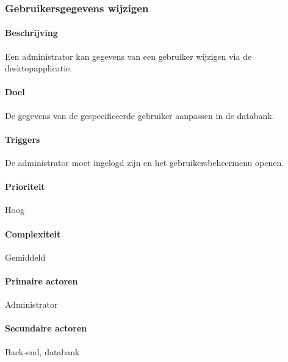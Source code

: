 \subsubsection{Gebruikersgegevens wijzigen}
\begin{compact}
\paragraph{Beschrijving} Een administrator kan gegevens van een gebruiker wijzigen via de desktopapplicatie.
\paragraph{Doel} De gegevens van de gespecificeerde gebruiker aanpassen in de databank.
\paragraph{Triggers}De administrator moet ingelogd zijn en het gebruikersbeheermenu openen.
\paragraph{Prioriteit}Hoog
\paragraph{Complexiteit}Gemiddeld
\paragraph{Primaire actoren}Administrator
\paragraph{Secundaire actoren}Back-end, databank

\end{compact}
